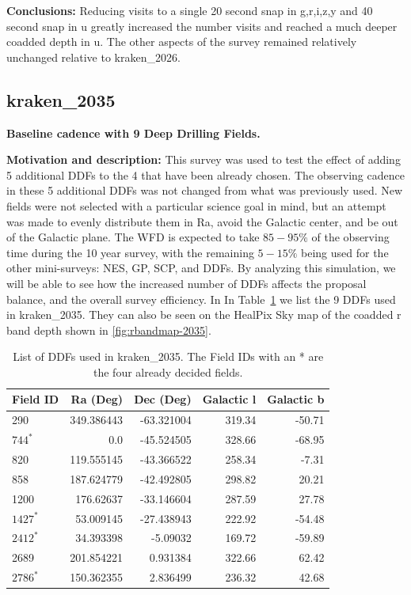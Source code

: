 \documentclass[DM,authoryear,toc]{lsstdoc}
\begin{document}
\textbf{Conclusions:}  Reducing visits to a single 20 second snap in g,r,i,z,y and 40 second snap in u greatly increased
the number visits and reached a much deeper coadded depth in u. The other aspects of the survey remained relatively
unchanged relative to kraken\_2026.


\subsection{kraken\_2035}  \label{kraken2035}

\textbf{Baseline cadence with 9 Deep Drilling Fields.}

\textbf{Motivation and description:} This survey was used to test the effect of adding 5 additional
DDFs to the 4 that have been already chosen. The observing cadence in these 5 additional DDFs
was not changed from what was previously used. New fields were not selected with a
particular science goal in mind, but an attempt was made to evenly distribute them in Ra, avoid
the Galactic center, and be out of the Galactic plane. The WFD is expected to take $85-95\%$ of
the observing time during the 10 year survey, with the remaining $5-15\%$ being used for the
other mini-surveys: NES, GP, SCP, and DDFs. By analyzing this simulation, we will be able to see
how the increased number of DDFs affects the proposal balance, and the overall survey efficiency.
In In Table~\ref{tab:ddfs} we list the 9 DDFs used in kraken\_2035. They can also be seen on the
HealPix Sky map of the coadded r band depth shown in \autoref{fig:rbandmap-2035}.

\begin{table}[htp]
\caption{List of DDFs used in kraken\_2035. The Field IDs with an * are the four already decided fields.}
\begin{center}
\small
\begin{tabular}{lrrrr}
\toprule
Field ID & Ra (Deg) & Dec (Deg) & Galactic l & Galactic b \\
\midrule
290  & 349.386443 & -63.321004 & 319.34 & -50.71 \\
$744^{*}$  &   0.0      & -45.524505 & 328.66 & -68.95 \\
820  & 119.555145 & -43.366522 & 258.34 & -7.31 \\
858  & 187.624779 & -42.492805 & 298.82 &  20.21 \\
1200 & 176.62637  & -33.146604 & 287.59 &  27.78 \\
$1427^{*}$ & 53.009145  & -27.438943 & 222.92 & -54.48 \\
$2412^{*}$ & 34.393398  & -5.09032   & 169.72 & -59.89 \\
2689 & 201.854221 &  0.931384  & 322.66 &  62.42 \\
$2786^{*}$ & 150.362355 &  2.836499  & 236.32 &  42.68 \\
\bottomrule
\end{tabular}
\end{center}
\label{tab:ddfs}
\end{table}
\end{document}
